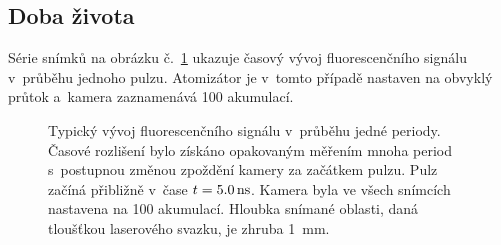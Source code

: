 \subsection{Doba života}
\label{sec:lif-lifetime}

Série snímků na obrázku č.~\ref{fig:lif-timeev} ukazuje časový vývoj
fluorescenčního signálu v~průběhu jednoho pulzu.
Atomizátor je v~tomto případě nastaven na obvyklý průtok
a~kamera zaznamenává 100 akumulací.

\begin{figure}[p]
	\centering
	
	\caption{Typický vývoj fluorescenčního signálu v~průběhu jedné periody.
		Časové rozlišení bylo získáno opakovaným měřením mnoha period
		s~postupnou změnou zpoždění kamery za začátkem pulzu.
		Pulz začíná přibližně v~čase $t = \SI{5.0}{\nano\second}$.
		Kamera byla ve všech snímcích nastavena na \num{100} akumulací.
		Hloubka snímané oblasti, daná tloušťkou laserového svazku,
		je zhruba \SI{1}{\milli\metre}.}
	\label{fig:lif-timeev}
\end{figure}
